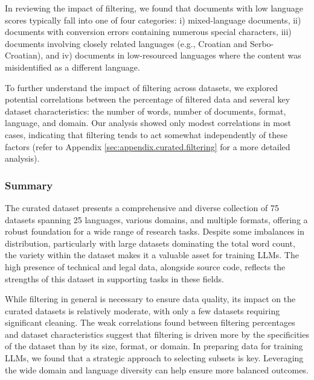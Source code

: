In reviewing the impact of filtering, we found that documents with low language scores typically fall into one of four categories: i) mixed-language documents, ii) documents with conversion errors containing numerous special characters, iii) documents involving closely related languages (e.g., Croatian and Serbo-Croatian), and iv) documents in low-resourced languages where the content was misidentified as a different language. 

To further understand the impact of filtering across datasets, we explored potential correlations between the percentage of filtered data and several key dataset characteristics: the number of words, number of documents, format, language, and domain. Our analysis showed only modest correlations in most cases, indicating that filtering tends to act somewhat independently of these factors (refer to Appendix \ref{sec:appendix.curated.filtering} for a more detailed analysis).


\subsubsection{Summary}
The curated dataset presents a comprehensive and diverse collection of 75 datasets spanning 25 languages, various domains, and multiple formats, offering a robust foundation for a wide range of research tasks. Despite some imbalances in distribution, particularly with large datasets dominating the total word count, the variety within the dataset makes it a valuable asset for training LLMs. The high presence of technical and legal data, alongside source code, reflects the strengths of this dataset in supporting tasks in these fields.

While filtering in general is necessary to ensure data quality, its impact on the curated datasets is relatively moderate, with only a few datasets requiring significant cleaning. The weak correlations found between filtering percentages and dataset characteristics suggest that filtering is driven more by the specificities of the dataset than by its size, format, or domain. 
In preparing data for training LLMs, we found that a strategic approach to selecting subsets is key. Leveraging the wide domain and language diversity can help ensure more balanced outcomes. 